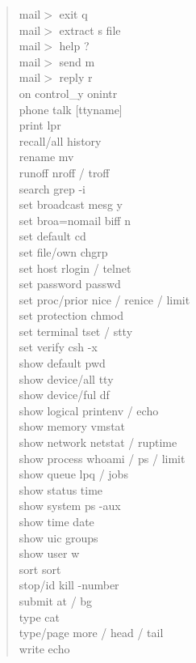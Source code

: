 \begin{quote}
\begin{tabbing}
mail$>$ exit	\>q\\
mail$>$ extract	\>s file\\
mail$>$ help	\>?\\
mail$>$ send 	\>m\\
mail$>$ reply	\>r\\
on control\_y	\>onintr\\
phone		\>talk [ttyname]\\
print		\>lpr\\
recall/all	\>history\\
rename		\>mv\\
runoff		\>nroff / troff\\
search		\>grep -i\\
set broadcast	\>mesg y\\
set broa=nomail \>biff n\\
set default	\>cd\\
set file/own	\>chgrp\\
set host	\>rlogin / telnet\\
set password	\>passwd\\
set proc/prior	\>nice / renice / limit\\
set protection	\>chmod\\
set terminal	\>tset / stty\\
set verify	\>csh -x\\
show default	\>pwd\\
show device/all	\>tty\\
show device/ful \>df\\
show logical	\>printenv / echo\\
show memory	\>vmstat\\
show network	\>netstat / ruptime\\
show process    \>whoami / ps / limit\\
show queue	\>lpq / jobs\\
show status	\>time\\
show system	\>ps -aux\\
show time	\>date\\
show uic	\>groups\\
show user	\>w\\
sort		\>sort\\
stop/id		\>kill -number\\
submit		\>at / bg\\
type		\>cat\\
type/page	\>more / head / tail\\
write		\>echo
\end{tabbing}
\end{quote}


